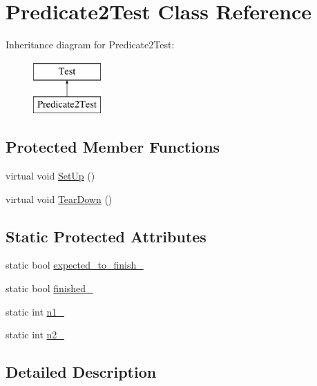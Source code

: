 \hypertarget{classPredicate2Test}{\section{\-Predicate2\-Test \-Class \-Reference}
\label{dc/dc4/classPredicate2Test}
}
\-Inheritance diagram for \-Predicate2\-Test\-:\begin{figure}[H]
\begin{center}
\leavevmode
\includegraphics[height=2.000000cm]{dc/dc4/classPredicate2Test}
\end{center}
\end{figure}
\subsection*{\-Protected \-Member \-Functions}
\begin{DoxyCompactItemize}
\item 
virtual void \hyperlink{classPredicate2Test_a901706a587f9ae84df8b2395fbe759cb}{\-Set\-Up} ()
\item 
virtual void \hyperlink{classPredicate2Test_a870a092058305911f3d42df45dd657e5}{\-Tear\-Down} ()
\end{DoxyCompactItemize}
\subsection*{\-Static \-Protected \-Attributes}
\begin{DoxyCompactItemize}
\item 
static bool \hyperlink{classPredicate2Test_af30fae6aaebdd5a6cb055c420573754d}{expected\-\_\-to\-\_\-finish\-\_\-}
\item 
static bool \hyperlink{classPredicate2Test_a9189d6cfedf2ace6f5f6aa152ba38f83}{finished\-\_\-}
\item 
static int \hyperlink{classPredicate2Test_a7a61c539c18d10f12696fc25b115d699}{n1\-\_\-}
\item 
static int \hyperlink{classPredicate2Test_a7dc886196252de63d1ca064997069377}{n2\-\_\-}
\end{DoxyCompactItemize}


\subsection{\-Detailed \-Description}


